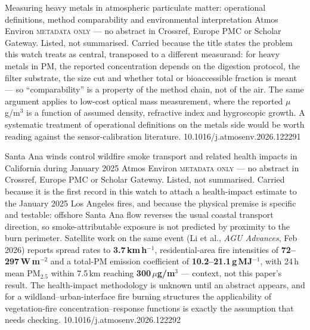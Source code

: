 \documentclass[10pt]{article}
\begin{document}
{Measuring heavy metals in atmospheric particulate matter: operational definitions, method
comparability and environmental interpretation}
{Atmos Environ}
{\textsc{metadata only} --- no abstract in Crossref, Europe PMC or Scholar Gateway.
Listed, not summarised. Carried because the title states the problem this watch treats as
central, transposed to a different measurand: for heavy metals in PM, the reported
concentration depends on the digestion protocol, the filter substrate, the size cut and
whether total or bioaccessible fraction is meant --- so ``comparability'' is a property of
the method chain, not of the air. The same argument applies to low-cost optical mass
measurement, where the reported $\mu$g/m$^3$ is a function of assumed density, refractive
index and hygroscopic growth. A systematic treatment of operational definitions on the
metals side would be worth reading against the sensor-calibration literature.}
{10.1016/j.atmosenv.2026.122291}


{Santa Ana winds control wildfire smoke transport and related health impacts in California
during January 2025}
{Atmos Environ}
{\textsc{metadata only} --- no abstract in Crossref, Europe PMC or Scholar Gateway.
Listed, not summarised. Carried because it is the first record in this watch to attach a
health-impact estimate to the January 2025 Los Angeles fires, and because the physical
premise is specific and testable: offshore Santa Ana flow reverses the usual coastal
transport direction, so smoke-attributable exposure is not predicted by proximity to the
burn perimeter. Satellite work on the same event (Li et al., \textit{AGU Advances}, Feb
2026) reports spread rates to \textbf{3.7\,km\,h$^{-1}$}, residential-area fire
intensities of \textbf{72--297\,W\,m$^{-2}$} and a total-PM emission coefficient of
\textbf{10.2--21.1\,g\,MJ$^{-1}$}, with 24\,h mean PM$_{2.5}$ within 7.5\,km reaching
\textbf{300\,$\mu$g/m$^3$} --- context, not this paper's result. The health-impact
methodology is unknown until an abstract appears, and for a wildland--urban-interface fire
burning structures the applicability of vegetation-fire concentration--response functions
is exactly the assumption that needs checking.}
{10.1016/j.atmosenv.2026.122292}
\end{document}
